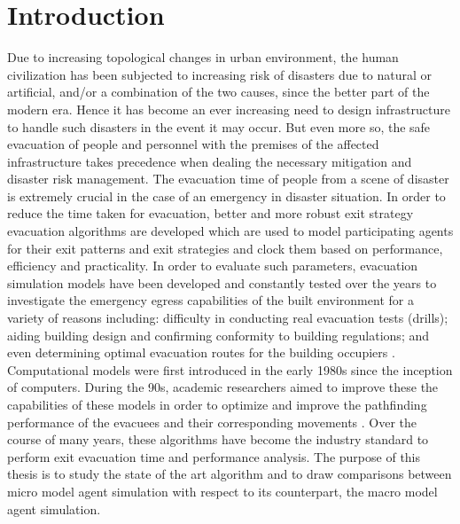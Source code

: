 
\chapter{Introduction\label{ch:intro}}

Due to increasing topological changes in urban environment, the human civilization has been subjected to increasing risk of disasters due to natural or artificial, and/or a combination of the two causes, since the better part of the modern era. Hence it has become an ever increasing need to design infrastructure to handle such disasters in the event it may occur. But even more so, the safe evacuation of people and personnel with the premises of the affected infrastructure takes precedence when dealing the necessary mitigation and disaster risk management. The evacuation time of people from a scene of disaster is extremely crucial in the case of an emergency in disaster situation. In order to reduce the time taken for evacuation, better and more robust exit strategy evacuation algorithms are developed which are used to model participating agents for their exit patterns and exit strategies and clock them based on performance, efficiency and practicality. In order to evaluate such parameters, evacuation simulation models have been developed and constantly tested over the years to investigate the emergency egress capabilities of the built environment for a variety of reasons including: difficulty in conducting real evacuation tests (drills); aiding building design and confirming conformity to building regulations; and even determining optimal evacuation routes for the building occupiers \cite{ref1}. Computational models were first introduced in the early 1980s since the inception of computers. During the 90s, academic researchers aimed to improve these the capabilities of these models in order to optimize and improve the pathfinding performance of the evacuees and their corresponding movements \cite{ref2}. Over the course of many years, these algorithms have become the industry standard to perform exit evacuation time and performance analysis. The purpose of this thesis is to study the state of the art algorithm and to draw comparisons between micro model agent simulation with respect to its counterpart, the macro model agent simulation.


